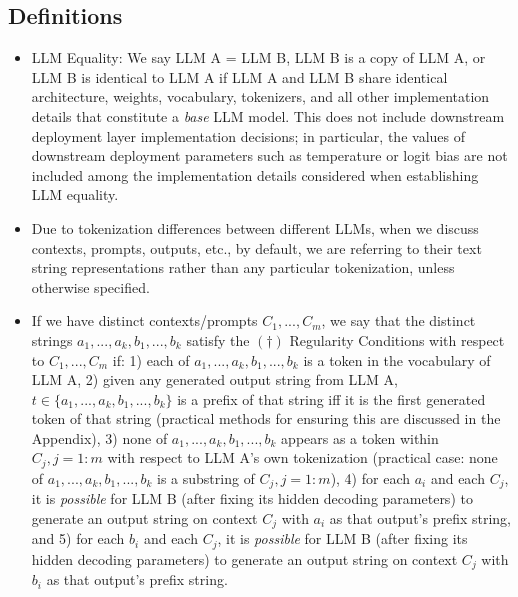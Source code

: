 \documentclass{article}
\begin{document}
\subsection{Definitions}
\begin{itemize}
\item LLM Equality: We say LLM A = LLM B, LLM B is a copy of LLM A, or LLM B is identical to LLM A if LLM A and LLM B share identical architecture, weights, vocabulary, tokenizers, and all other implementation details that constitute a \textit{base} LLM model. This does not include downstream deployment layer implementation decisions; in particular, the values of downstream deployment parameters such as temperature or logit bias are not included among the implementation details considered when establishing LLM equality.
\item Due to tokenization differences between different LLMs, when we discuss contexts, prompts, outputs, etc., by default, we are referring to their text string representations rather than any particular tokenization, unless otherwise specified.
\item If we have distinct contexts/prompts $\displaystyle C_{1} ,...,C_{m}$, we say that the distinct strings $\displaystyle a_{1} ,...,a_{k} ,b_{1} ,...,b_{k}$ satisfy the $\displaystyle ( \dagger )$ Regularity Conditions with respect to $\displaystyle C_{1} ,...,C_{m}$ if: 1) each of $\displaystyle a_{1} ,...,a_{k} ,b_{1} ,...,b_{k}$ is a token in the vocabulary of LLM A, 2) given any generated output string from LLM A, $\displaystyle t\in \{a_{1} ,...,a_{k} ,b_{1} ,...,b_{k}\}$ is a prefix of that string iff it is the first generated token of that string (practical methods for ensuring this are discussed in the Appendix), 3) none of $\displaystyle a_{1} ,...,a_{k} ,b_{1} ,...,b_{k}$ appears as a token within $\displaystyle C_{j} ,j=1:m$ with respect to LLM A's own tokenization (practical case: none of $\displaystyle a_{1} ,...,a_{k} ,b_{1} ,...,b_{k}$ is a substring of $\displaystyle C_{j} ,j=1:m$), 4) for each $\displaystyle a_{i}$ and each $\displaystyle C_{j}$, it is \textit{possible} for LLM B (after fixing its hidden decoding parameters) to generate an output string on context $\displaystyle C_{j}$ with $\displaystyle a_{i}$ as that output's prefix string, and 5) for each $\displaystyle b_{i}$ and each $\displaystyle C_{j}$, it is \textit{possible} for LLM B (after fixing its hidden decoding parameters) to generate an output string on context $\displaystyle C_{j}$ with $\displaystyle b_{i}$ as that output's prefix string.
\end{itemize}
\end{document}
